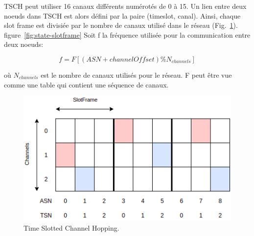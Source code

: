TSCH peut utiliser 16 canaux différents numérotés de 0 à 15. Un lien entre deux noeuds dans TSCH est alors défini par la paire (timeslot, canal). Ainsi, chaque slot frame est divisiée par le nombre de canaux utilisé dans le réseau (Fig.~\ref{fig:state-tsch}). figure~\ref*{fig:state-slotframe}  Soit f la fréquence utilisée pour la communication entre deux noeuds:

\[
    f = F[(ASN + channel Offset)\% N_{channels}]
\]

où $N_{channels}$ est le nombre de canaux utilisés pour le réseau. F peut être vue comme une table qui contient une séquence de canaux.

\begin{figure}[H]
    \centering
    \includegraphics[scale=0.5]{res/pictures/tsch.drawio.png}
    \caption{Time Slotted Channel Hopping.}
    \label{fig:state-tsch}
\end{figure}



